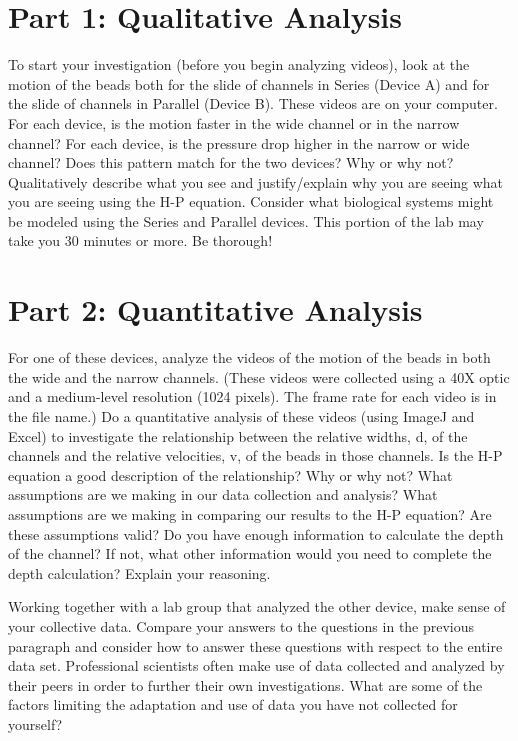 \section*{Part 1: Qualitative Analysis}
To start your investigation (before you begin analyzing videos), look at the motion of the
beads both for the slide of channels in Series (Device A) and for the slide of channels in Parallel (Device B).
These videos are on your computer.
For each device, is the motion faster in the wide channel or in the narrow channel?
For each device, is the pressure drop higher in the narrow or wide channel?
Does this pattern match for the two devices?
Why or why not?
Qualitatively describe what you see and justify/explain why you are seeing what you are seeing using the H-P equation.
Consider what biological systems might be modeled using the Series and Parallel devices.
This portion of the lab may take you 30 minutes or more.
Be thorough!

\section*{Part 2: Quantitative Analysis}
For one of these devices, analyze the videos of the motion of the beads in both the wide and
the narrow channels.
(These videos were collected using a 40X optic and a medium-level resolution (1024 pixels).
The frame rate for each video is in the file name.)
Do a quantitative analysis of these videos (using ImageJ and Excel) to investigate the relationship between the relative widths, d, of the channels and the relative velocities, v, of the beads in those channels.
Is the H-P equation a good description of the relationship?
Why or why not?
What assumptions are we making in our data collection and analysis?
What assumptions are we making in comparing our results to the H-P equation?
Are these assumptions valid?
Do you have enough information to calculate the depth of the channel?
If not, what other information would you need to complete the depth calculation?
Explain your reasoning.
\par
Working together with a lab group that analyzed the other device, make sense of your collective data.
Compare your answers to the questions in the previous paragraph and consider how to answer these questions with respect to the entire data set.
Professional scientists often make use of data collected and analyzed by their peers in order to further their own investigations.
What are some of the factors limiting the adaptation and use of data you have not collected for yourself?